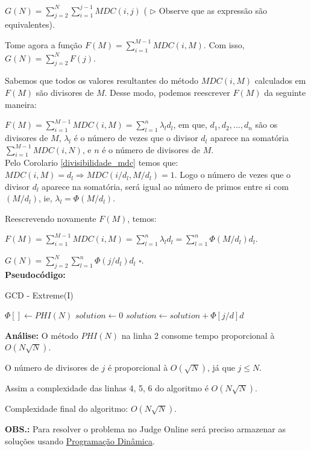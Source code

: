 $G(N) = \sum_{j=2}^N\sum_{i=1}^{j-1}MDC(i,j)$ ( $\rhd$ Observe que as expressão são equivalentes).

Tome agora a função $F(M) = \sum_{i=1}^{M-1}MDC(i, M)$. Com isso, $G(N) = \sum_{j=2}^NF(j)$.

Sabemos que todos os valores resultantes do método $MDC(i,M)$ calculados em $F(M)$ são divisores de $M$. Desse modo, podemos reescrever $F(M)$ da seguinte maneira:

$F(M) = \sum_{i=1}^{M-1}MDC(i, M) = \sum_{l=1}^{n}\lambda_l d_l$, em que, $d_1, d_2,..., d_n$ são os divisores de $M$, $\lambda_l$ é o número de vezes que o divisor $d_l$ aparece na somatória $\sum_{i=1}^{M-1}MDC(i,N)$, e $n$ é o número de divisores de $M$.
\\

Pelo Corolario \autoref{divisibilidade_mdc} temos que: $MDC(i,M) = d_l \Rightarrow MDC(i/d_l,M/d_l) = 1$. Logo o número de vezes que o divisor $d_l$ aparece na somatória, será igual ao número de primos entre si com $(M/d_l)$, ie, $\lambda_l = \Phi(M/d_l)$.

Reescrevendo novamente $F(M)$, temos:

$F(M) = \sum_{i=1}^{M-1}MDC(i, M) = \sum_{l=1}^n \lambda_l d_l = \sum_{l=1}^n \Phi(M/d_l) d_l$.

$G(N) = \sum_{j=2}^N \sum_{l=1}^n \Phi(j/d_l)d_l$ $\square$.
\\

\textbf{Pseudocódigo:}
\begin{algorithm}
\caption{GCD - Extreme(I)}\label{gcd_extreme}
\begin{algorithmic}[1]
\State $\Phi[] \gets PHI(N)$
\State $solution \gets 0$
\State $solution \gets solution + \Phi[j/d] d$
\EndFor
\EndFor
\State {}
\EndProcedure
\end{algorithmic}
\end{algorithm}


\textbf{Análise:}
O método $PHI(N)$ na linha 2 consome tempo proporcional à $O(N\sqrt{N})$.

O número de divisores de $j$ é proporcional à $O(\sqrt{N})$, já que $j \leq N$.

Assim a complexidade das linhas 4, 5, 6 do algoritmo é $O(N\sqrt{N})$.

Complexidade final do algoritmo: $O(N\sqrt{N})$.

\textbf{OBS.:} Para resolver o problema no Judge Online será preciso armazenar as soluções usando \href{https://linux.ime.usp.br/~stefanot/mac499/template.pdf}{Programação Dinâmica}.






